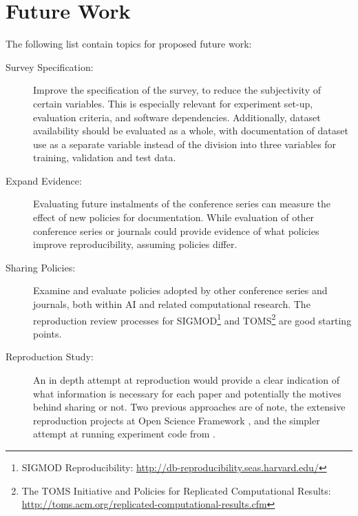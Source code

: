 \section{Future Work}
The following list contain topics for proposed future work:
\begin{description}
\item[Survey Specification:] Improve the specification of the survey, to reduce the subjectivity of certain variables. This is especially relevant for experiment set-up, evaluation criteria, and software dependencies. Additionally, dataset availability should be evaluated as a whole, with documentation of dataset use as a separate variable instead of the division into three variables for training, validation and test data.
\item[Expand Evidence:] Evaluating future instalments of the conference series can measure the effect of new policies for documentation. While evaluation of other conference series or journals could provide evidence of what policies improve reproducibility, assuming policies differ.
\item[Sharing Policies:] Examine and evaluate policies adopted by other conference series and journals, both within AI and related computational research. The reproduction review processes for SIGMOD\footnote{SIGMOD Reproducibility: \url{http://db-reproducibility.seas.harvard.edu/}} and TOMS\footnote{The TOMS Initiative and Policies for Replicated Computational Results: \url{http://toms.acm.org/replicated-computational-results.cfm}} are good starting points.
\item[Reproduction Study:] An in depth attempt at reproduction would provide a clear indication of what information is necessary for each paper and potentially the motives behind sharing or not. Two previous approaches are of note, the extensive reproduction projects at Open Science Framework \cite{aarts2016, Errington2017}, and the simpler attempt at running experiment code from \cite{Collberg2016}.
\end{description}

\cleardoublepage

